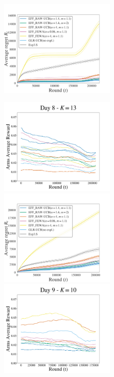 \begin{figure}[p!]
\includegraphics[clip, width= 0.495\textwidth]{4Restless/fig/DAY7.pdf}
\end{figure}
\begin{figure}[p!]
\includegraphics[clip, width= 0.495\textwidth]{4Restless/fig/reward_plot_day8.pdf}
\includegraphics[clip, width= 0.495\textwidth]{4Restless/fig/DAY8.pdf}
\includegraphics[clip, width= 0.495\textwidth]{4Restless/fig/reward_plot_day9.pdf}

\end{figure}
